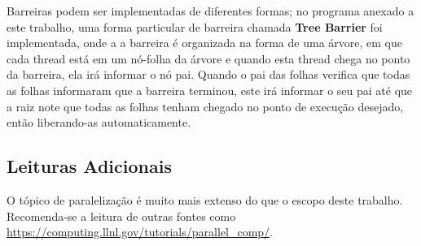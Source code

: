 Barreiras podem ser implementadas de diferentes formas; no programa anexado a este trabalho, uma forma particular de barreira chamada \textbf{Tree Barrier} foi implementada, onde a a barreira é organizada na forma de uma árvore, em que cada thread está em um nó-folha da árvore e quando esta thread chega no ponto da barreira, ela irá informar o nó pai. Quando o pai das folhas verifica que todas as folhas informaram que a barreira terminou, este irá informar o seu pai até que a raiz note que todas as folhas tenham chegado no ponto de execução desejado, então liberando-as automaticamente.

\subsection{Leituras Adicionais}
O tópico de paralelização é muito mais extenso do que o escopo deste trabalho. Recomenda-se a leitura de outras fontes como \url{https://computing.llnl.gov/tutorials/parallel\_comp/}\cite{parallelcomp:website}.
